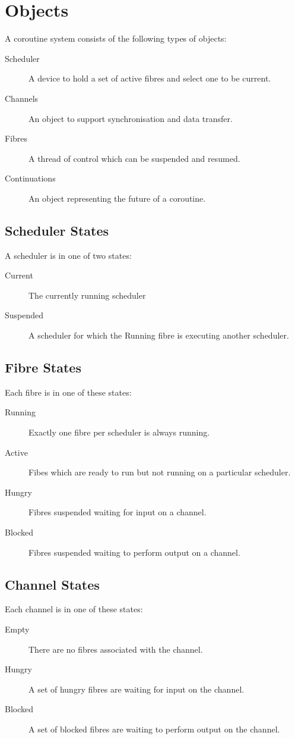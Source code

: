 \documentclass[oneside]{book}
\begin{document}
\section{Objects}
A coroutine system consists of the following types of objects:
\begin{description}
\item[Scheduler] A device to hold a set of active fibres and
select one to be current.
\item[Channels] An object to support synchronisation and data transfer.
\item[Fibres] A thread of control which can be suspended and resumed.
\item[Continuations] An object representing the future of a coroutine.
\end{description}

\subsection{Scheduler States}
A scheduler is in one of two states:
\begin{description}
\item[Current] The currently running scheduler
\item[Suspended] A scheduler for which the Running fibre is
executing another scheduler.
\end{description}

\subsection{Fibre States}
Each fibre is in one of these states:
\begin{description}
\item[Running] Exactly one fibre per scheduler is always running.
\item[Active] Fibes which are ready to run but not running on a particular scheduler.
\item[Hungry] Fibres suspended waiting for input on a channel.
\item[Blocked] Fibres suspended waiting to perform output on a channel.
\end{description}

\subsection{Channel States}
Each channel is in one of these states:
\begin{description}
\item[Empty] There are no fibres associated with the channel.
\item[Hungry] A set of hungry fibres are waiting for input on the channel.
\item[Blocked] A set of blocked fibres are waiting to perform output on the channel.
\end{description}
\end{document}
